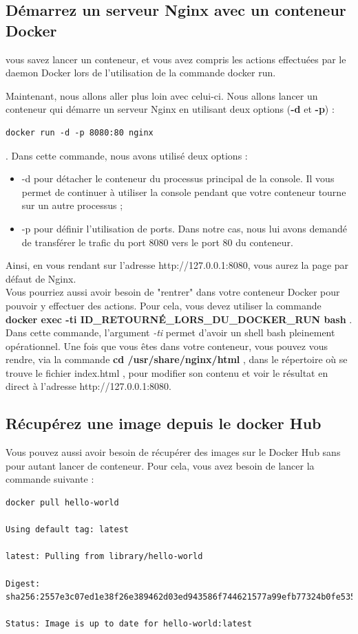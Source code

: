 \documentclass[12pt,a4paper]{article}
\begin{document}
\subsection{Démarrez un serveur Nginx avec un conteneur Docker}
vous savez lancer un conteneur, et vous avez compris les actions effectuées par le daemon Docker lors de l'utilisation de la commande docker run.

Maintenant, nous allons aller plus loin avec celui-ci. Nous allons lancer un conteneur qui démarre un serveur Nginx en utilisant deux options (\textbf{-d} et \textbf{-p}) :
\begin{verbatim}
docker run -d -p 8080:80 nginx 
\end{verbatim}  .
Dans cette commande, nous avons utilisé deux options :
\begin{itemize}
\item -d pour détacher le conteneur du processus principal de la console. Il vous permet de continuer à utiliser la console pendant que votre conteneur tourne sur un autre processus ;
\item -p pour définir l'utilisation de ports. Dans notre cas, nous lui avons demandé de transférer le trafic du port 8080 vers le port 80 du conteneur.
\end{itemize}
    Ainsi, en vous rendant sur l'adresse  http://127.0.0.1:8080, vous aurez la page par défaut de Nginx.\\
Vous pourriez aussi avoir besoin de "rentrer" dans votre conteneur Docker pour pouvoir y effectuer des actions. Pour cela, vous devez utiliser la commande \\
\textbf{docker exec -ti ID\_RETOURNÉ\_LORS\_DU\_DOCKER\_RUN bash}  . Dans cette commande, l'argument \textit{-ti} permet d'avoir un shell bash pleinement opérationnel. Une fois que vous êtes dans votre conteneur, vous pouvez vous rendre, via la commande \textbf{cd /usr/share/nginx/html}  , dans le répertoire où se trouve le fichier index.html  , pour modifier son contenu et voir le résultat en direct à l'adresse http://127.0.0.1:8080.

\subsection{Récupérez une image depuis le docker Hub}
Vous pouvez aussi avoir besoin de récupérer des images sur le Docker Hub sans pour autant lancer de conteneur. Pour cela, vous avez besoin de lancer la commande suivante :

\begin{verbatim}
docker pull hello-world

Using default tag: latest

latest: Pulling from library/hello-world

Digest: sha256:2557e3c07ed1e38f26e389462d03ed943586f744621577a99efb77324b0fe535

Status: Image is up to date for hello-world:latest
\end{verbatim}
\end{document}
